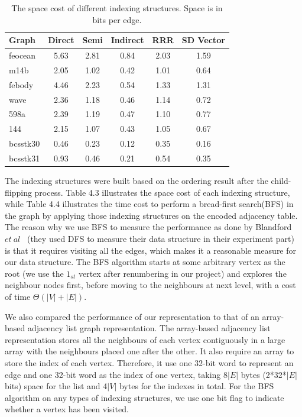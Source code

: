\documentclass[12pt,glossary]{dalthesis}
\begin{document}
\begin{table}[ht]
\centering
\caption{The space cost of different indexing structures. Space is in bits per edge.}
\label{my-label}
\begin{tabular}{|l||c||c||c||c||c|}
\hline
Graph    & Direct & Semi & Indirect & RRR & SD Vector \\ \hline
feocean  &    5.63    &   2.81   &     0.84     &  2.03   &   1.59        \\
m14b     &    2.05    &   1.02   &    0.42      &  1.01   &   0.64        \\
febody   &    4.46   &   2.23   &     0.54     &  1.33   &    1.31        \\
wave     &   2.36    &   1.18   &    0.46      &   1.14   &   0.72         \\
598a     &    2.39    &   1.19   &   0.47       &  1.10   &    0.77       \\
144      &    2.15   &   1.07   &    0.43      &  1.05    &   0.67          \\
bcsstk30 &   0.46   &   0.23   &      0.12    &   0.35   &   0.16        \\
bcsstk31 &   0.93   &   0.46   &     0.21     &  0.54   &   0.35        \\ \hline
\end{tabular}
\end{table}
\bigskip

The indexing structures were built based on the ordering result after the child-flipping process. Table 4.3 illustrates the space cost of each indexing structure, while Table 4.4 illustrates the time cost to perform a bread-first search(BFS) in the graph by applying those indexing structures on the encoded adjacency table. The reason why we use BFS to measure the performance as done by Blandford $et \ al$~\cite{compact-representation} (they used DFS to measure their data structure in their experiment part) is that it requires visiting all the edges, which makes it a reasonable measure for our data structure. The BFS algorithm starts at some arbitrary vertex as the root (we use the $1_{st}$ vertex after renumbering in our project) and explores the neighbour nodes first, before moving to the neighbours at next level, with a cost of time $\Theta(|V| + |E|)$. 

\bigskip

We also compared the performance of our representation to that of an array-based adjacency list graph representation. The array-based adjacency list representation stores all the neighbours of each vertex contiguously in a large array with the neighbours placed one after the other. It also require an array to store the index of each vertex. Therefore, it use one 32-bit word to represent an edge and one 32-bit word as the index of one vertex, taking 8$|E|$ bytes (2*32*$|E|$ bits) space for the list and 4$|V|$ bytes for the indexes in total. For the BFS algorithm on any types of indexing structures, we use one bit flag to indicate whether a vertex has been visited.
\bigskip     
\end{document}
